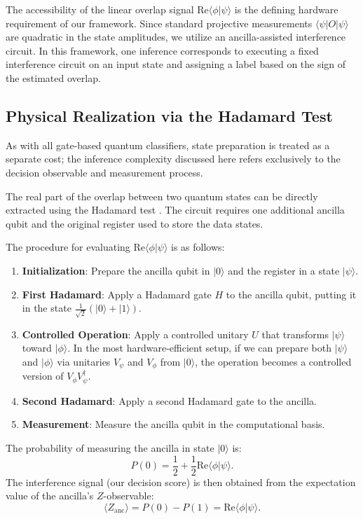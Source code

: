\documentclass[conference]{IEEEtran}
\begin{document}
The accessibility of the linear overlap signal $\mathrm{Re}\langle \phi | \psi \rangle$ is the defining hardware requirement of our framework. Since standard projective measurements $\langle \psi | O | \psi \rangle$ are quadratic in the state amplitudes, we utilize an ancilla-assisted interference circuit. In this framework, one inference corresponds to executing a fixed interference circuit on an input state and assigning a label based on the sign of the estimated overlap.

\subsection{Physical Realization via the Hadamard Test}

As with all gate-based quantum classifiers, state preparation is treated as a separate cost; the inference complexity discussed here refers exclusively to the decision observable and measurement process.

The real part of the overlap between two quantum states can be directly extracted using the Hadamard test \cite{ekert2002direct}. The circuit requires one additional ancilla qubit and the original register used to store the data states.

The procedure for evaluating $\mathrm{Re}\langle \phi | \psi \rangle$ is as follows:
\begin{enumerate}
    \item \textbf{Initialization}: Prepare the ancilla qubit in $|0\rangle$ and the register in a state $|\psi\rangle$.
    \item \textbf{First Hadamard}: Apply a Hadamard gate $H$ to the ancilla qubit, putting it in the state $\frac{1}{\sqrt{2}}(|0\rangle + |1\rangle)$.
    \item \textbf{Controlled Operation}: Apply a controlled unitary $U$ that transforms $|\psi\rangle$ toward $|\phi\rangle$. In the most hardware-efficient setup, if we can prepare both $|\psi\rangle$ and $|\phi\rangle$ via unitaries $V_\psi$ and $V_\phi$ from $|0\rangle$, the operation becomes a controlled version of $V_\phi V_\psi^\dagger$.
    \item \textbf{Second Hadamard}: Apply a second Hadamard gate to the ancilla.
    \item \textbf{Measurement}: Measure the ancilla qubit in the computational basis.
\end{enumerate}

The probability of measuring the ancilla in state $|0\rangle$ is:
\begin{equation}
P(0) = \frac{1}{2} + \frac{1}{2} \mathrm{Re}\langle \phi | \psi \rangle.
\end{equation}
The interference signal (our decision score) is then obtained from the expectation value of the ancilla's $Z$-observable:
\begin{equation}
\langle Z_{\text{anc}} \rangle = P(0) - P(1) = \mathrm{Re}\langle \phi | \psi \rangle.
\end{equation}
\end{document}
